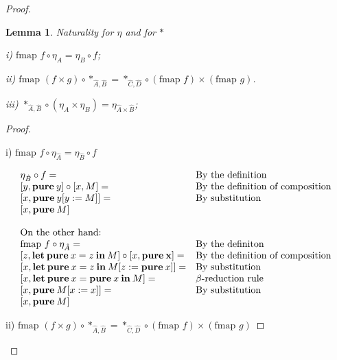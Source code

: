\documentclass[a4paper]{article}
\newtheorem{lemma}{Lemma}
\begin{document}
\begin{proof}
\begin{lemma} Naturality for $\eta$ and for $\ast$

  i) $\text{fmap } f \circ \eta_A = \eta_B \circ f$;

  ii) $\text{fmap } (f \times g) \circ \ast_{\hat{A}, \hat{B}} = \ast_{\hat{C},\hat{D}} \circ (\text{fmap } f) \times (\text{fmap } g)$.

  iii) $\ast_{\hat{A},\hat{B}} \circ (\eta_{A} \times \eta_{B}) = \eta_{\hat{A} \times \hat{B}}$;
\end{lemma}

\begin{proof}
  $ $

  i) $\text{fmap } f \circ \eta_{\hat{A}} = \eta_{\hat{B}} \circ f$

\vspace{\baselineskip}

$\begin{array}{lll}
&\eta_{\hat{B}} \circ f = & \text{By the definition} \\
&[y, {\bf pure \:} y] \circ [x, M] = & \text{By the definition of composition}\\
&[x, {\bf pure \:} y [y := M]] = & \text{By substitution}\\
&[x, {\bf pure \:} M]& \\
& &\\
&\text{On the other hand:}& \\
&\text{fmap } f \circ \eta_{\hat{A}} = & \text{By the definiton} \\
&[z, {\bf let \: pure \:} x = z {\: \bf in \:} M] \circ [x, {\bf pure \: x}] = & \text{By the definition of composition}\\
&[x, {\bf let \: pure \:} x = z {\: \bf in \:} M [z := {\bf pure \:} x]] = & \text{By substitution} \\
&[x, {\bf let \: pure \:} x = {\bf pure \:} x {\: \bf in \:} M] = & \text{$\beta$-reduction rule}\\
&[x, {\bf pure \:} M [x := x]] = & \text{By substitution}\\
&[x, {\bf pure \:} M]&
\end{array}$

\vspace{\baselineskip}

ii)  $\text{fmap } (f \times g) \circ \ast_{\hat{A}, \hat{B}} = \ast_{\hat{C},\hat{D}} \circ (\text{fmap } f) \times (\text{fmap } g)$

\vspace{\baselineskip}


\end{proof}
\end{proof}
\end{document}
